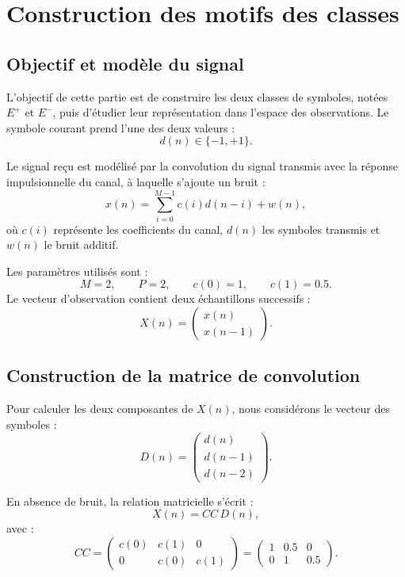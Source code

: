 
% 

\section{Construction des motifs des classes}

\subsection{Objectif et modèle du signal}

L'objectif de cette partie est de construire les deux classes de symboles, notées $E^+$ et $E^-$, puis d'étudier leur représentation dans l'espace des observations. Le symbole courant prend l'une des deux valeurs :
\[
d(n)\in\{-1,+1\}.
\]

Le signal reçu est modélisé par la convolution du signal transmis avec la réponse impulsionnelle du canal, à laquelle s'ajoute un bruit :
\begin{equation}
x(n)=\sum_{i=0}^{M-1}c(i)d(n-i)+w(n),
\end{equation}
où $c(i)$ représente les coefficients du canal, $d(n)$ les symboles transmis et $w(n)$ le bruit additif.

Les paramètres utilisés sont :
\[
M=2,\qquad P=2,\qquad c(0)=1,\qquad c(1)=0.5.
\]
Le vecteur d'observation contient deux échantillons successifs :
\[
X(n)=
\begin{pmatrix}
x(n)\\
x(n-1)
\end{pmatrix}.
\]

\subsection{Construction de la matrice de convolution}

Pour calculer les deux composantes de $X(n)$, nous considérons le vecteur des symboles :
\[
D(n)=
\begin{pmatrix}
d(n)\\
d(n-1)\\
d(n-2)
\end{pmatrix}.
\]

En absence de bruit, la relation matricielle s'écrit :
\begin{equation}
X(n)=CC\,D(n),
\end{equation}
avec :
\begin{equation}
CC=
\begin{pmatrix}
c(0)&c(1)&0\\
0&c(0)&c(1)
\end{pmatrix}
=
\begin{pmatrix}
1&0.5&0\\
0&1&0.5
\end{pmatrix}.
\end{equation}

